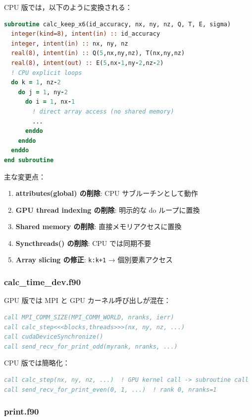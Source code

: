 CPU 版では，以下のように変換される：

\begin{lstlisting}[language=Fortran]
subroutine calc_keep_x6(id_accuracy, nx, ny, nz, Q, T, E, sigma)
  integer(kind=8), intent(in) :: id_accuracy
  integer, intent(in) :: nx, ny, nz
  real(8), intent(in) :: Q(5,nx,ny,nz), T(nx,ny,nz)
  real(8), intent(out) :: E(5,nx-1,ny-2,nz-2)
  ! CPU explicit loops
  do k = 1, nz-2
    do j = 1, ny-2
      do i = 1, nx-1
        ! direct array access (no shared memory)
        ...
      enddo
    enddo
  enddo
end subroutine
\end{lstlisting}

主な変更点：

\begin{enumerate}
  \item \textbf{attributes(global) の削除}: CPU サブルーチンとして動作
  \item \textbf{GPU thread indexing の削除}: 明示的な do ループに置換
  \item \textbf{Shared memory の削除}: 直接メモリアクセスに置換
  \item \textbf{Syncthreads() の削除}: CPU では同期不要
  \item \textbf{Array slicing の修正}: \texttt{k:k+1} → 個別要素アクセス
\end{enumerate}

\subsubsection{calc\_time\_dev.f90}

GPU 版では MPI と GPU カーネル呼び出しが混在：

\begin{lstlisting}[language=Fortran]
call MPI_COMM_SIZE(MPI_COMM_WORLD, nranks, ierr)
call calc_step<<<blocks,threads>>>(nx, ny, nz, ...)
call cudaDeviceSynchronize()
call send_recv_for_print_odd(myrank, nranks, ...)
\end{lstlisting}

CPU 版では簡略化：

\begin{lstlisting}[language=Fortran]
call calc_step(nx, ny, nz, ...)  ! GPU kernel call -> subroutine call
call send_recv_for_print_even(0, 1, ...)  ! rank 0, nranks=1
\end{lstlisting}

\subsubsection{print.f90}

